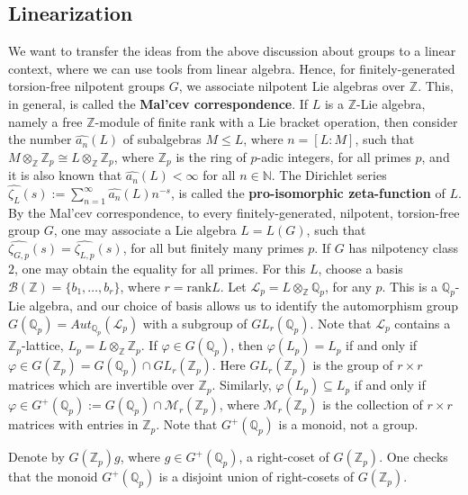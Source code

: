 \documentclass[12pt]{article}
\begin{document}
\subsection{Linearization}
We want to transfer the ideas from the above discussion about groups to a linear context, where we can use tools from linear algebra.
Hence, for finitely-generated torsion-free nilpotent groups $G$, we associate nilpotent Lie algebras over $\mathbb{Z}$. This, in general, is called the \textbf{Mal'cev correspondence}. 
If $L$ is a $\mathbb{Z}$-Lie algebra, namely a free $\mathbb{Z}$-module of finite rank with a Lie bracket operation, then consider the number $\hat{a_n}(L)$ of subalgebras $M\leq L$, where $n=[L:M]$, such that $M\otimes_{\mathbb{Z}}\mathbb{Z}_p\cong L\otimes_{\mathbb{Z}}\mathbb{Z}_p$, where $\mathbb{Z}_p$ is the ring of $p$-adic integers, for all primes $p$, and it is also known that $\hat{a_n}(L)<\infty$ for all $n\in\mathbb{N}$. The Dirichlet series $\hat{\zeta_L}(s):=\sum_{n=1}^{\infty}\hat{a_n}(L)n^{-s}$, is called the \textbf{pro-isomorphic zeta-function} of $L$. By the Mal'cev correspondence, to every finitely-generated, nilpotent, torsion-free group $G$, one may associate a Lie algebra $L=L(G)$, such that $\hat{\zeta_{G,p}}(s)=\hat{\zeta_{L,p}}(s)$, for all but finitely many primes $p$. If $G$ has nilpotency class $2$, one may obtain the equality for all primes. For this $L$, choose a basis $\mathcal{B}(\mathbb{Z})=\{b_1,\dots,b_r\}$, where $r=\mathrm{rank}L$. Let $\mathcal{L}_{p}=L\otimes_{\mathbb{Z}}\mathbb{Q}_p$, for any $p$. This is a $\mathbb{Q}_p$-Lie algebra, and our choice of basis allows us to identify the automorphism group $G(\mathbb{Q}_p)=Aut_{\mathbb{Q}_p}(\mathcal{L}_{p})$ with a subgroup of $GL_r(\mathbb{Q}_p)$. Note that $\mathcal{L}_{p}$ contains a $\mathbb{Z}_p$-lattice, $L_{p}=L\otimes_{\mathbb{Z}}\mathbb{Z}_p$. If $\varphi\in G(\mathbb{Q}_p)$, then $\varphi(L_{p})=L_{p}$ if and only if $\varphi\in G(\mathbb{Z}_p)=G(\mathbb{Q}_p)\cap GL_r(\mathbb{Z}_p)$. Here $GL_r(\mathbb{Z}_p)$ is the group of $r\times r$ matrices which are invertible over $\mathbb{Z}_p$. Similarly, $\varphi(L_{p})\subseteq L_{p}$ if and only if $\varphi\in G^+(\mathbb{Q}_p):=G(\mathbb{Q}_p)\cap \mathcal{M}_r(\mathbb{Z}_p)$, where $\mathcal{M}_r(\mathbb{Z}_p)$ is the collection of $r\times r$ matrices with entries in $\mathbb{Z}_p$. Note that $G^+(\mathbb{Q}_p)$ is a monoid, not a group.\par
Denote by $G(\mathbb{Z}_p)g$, where $g\in G^+(\mathbb{Q}_p)$, a right-coset of $G(\mathbb{Z}_p)$. One checks that the monoid $G^+(\mathbb{Q}_p)$ is a disjoint union of right-cosets of $G(\mathbb{Z}_p)$.\par
\end{document}
